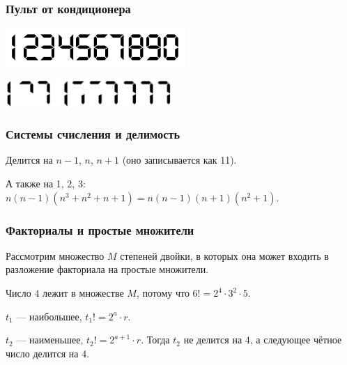 \documentclass[aspectratio=1610,12pt]{beamer}
\begin{document}
\begin{frame} \frametitle{Пульт от кондиционера}
\begin{center} \includegraphics[width=6.8cm]{img/Digiface} \end{center}


\begin{center} \includegraphics[width=6.3cm]{img/Digiface-A} \end{center}
\end{frame}


\begin{frame} \frametitle{Системы счисления и делимость}


Делится на $n-1$, $n$, $n+1$ (оно записывается как 11). \medskip \pause

А также на 1, 2, 3: $n(n-1)(n^3+n^2+n+1) = n(n-1)(n+1)(n^2+1)$.


\end{frame}


\begin{frame} \frametitle{Факториалы и простые множители}

Рассмотрим множество $M$ степеней двойки, в которых она может входить в разложение факториала на простые множители.

Число $4$ лежит в множестве $M$\!, потому что $6! = 2^4 \cdot 3^2 \cdot 5$. \medskip


$t_1$ — наибольшее, $t_1! = 2^a \cdot r$.

$t_2$ — наименьшее, $t_2! = 2^{a+1} \cdot r$. Тогда $t_2$ не делится на 4, а следующее чётное число делится на 4.

\end{frame}
\end{document}
